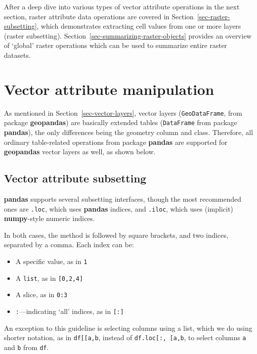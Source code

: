 \documentclass[
  letterpaper,
]{krantz}
\providecommand{\tightlist}{%
  \setlength{\itemsep}{0pt}\setlength{\parskip}{0pt}}\usepackage{longtable,booktabs,array}
\begin{document}
After a deep dive into various types of vector attribute operations in
the next section, raster attribute data operations are covered in
Section~\ref{sec-raster-subsetting}, which demonstrates extracting cell
values from one or more layers (raster subsetting).
Section~\ref{sec-summarizing-raster-objects} provides an overview of
`global' raster operations which can be used to summarize entire raster
datasets.

\section{Vector attribute
manipulation}\label{sec-vector-attribute-manipulation}

As mentioned in Section~\ref{sec-vector-layers}, vector layers
(\texttt{GeoDataFrame}, from package \textbf{geopandas}) are basically
extended tables (\texttt{DataFrame} from package \textbf{pandas}), the
only differences being the geometry column and class. Therefore, all
ordinary table-related operations from package \textbf{pandas} are
supported for \textbf{geopandas} vector layers as well, as shown below.

\subsection{Vector attribute
subsetting}\label{sec-vector-attribute-subsetting}

\textbf{pandas} supports several subsetting interfaces, though the most
recommended ones are \texttt{.loc}, which uses \textbf{pandas} indices,
and \texttt{.iloc}, which uses (implicit) \textbf{numpy}-style numeric
indices.

In both cases, the method is followed by square brackets, and two
indices, separated by a comma. Each index can be:

\begin{itemize}
\tightlist
\item
  A specific value, as in \texttt{1}
\item
  A \texttt{list}, as in \texttt{{[}0,2,4{]}}
\item
  A slice, as in \texttt{0:3}
\item
  \texttt{:}---indicating `all' indices, as in \texttt{{[}:{]}}
\end{itemize}

An exception to this guideline is selecting columns using a list, which
we do using shorter notation, as in
\texttt{df{[}{[}\textquotesingle{}a\textquotesingle{},\textquotesingle{}b\textquotesingle{}{]}{]}},
instead of
\texttt{df.loc{[}:,\ {[}\textquotesingle{}a\textquotesingle{},\textquotesingle{}b\textquotesingle{}{]}{]}},
to select columns \texttt{\textquotesingle{}a\textquotesingle{}} and
\texttt{\textquotesingle{}b\textquotesingle{}} from \texttt{df}.
\end{document}
